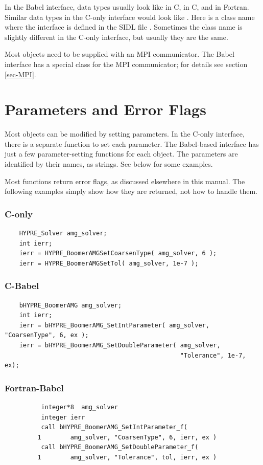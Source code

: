 In the Babel interface, data types usually look like  in
C,  in C, and  in Fortran.  Similar
data types in the C-only interface would look like
.  Here  is a class name where the
interface is defined in the SIDL file .
Sometimes the class name is slightly different in the C-only
interface, but usually they are the same.

Most \hypre{} objects need to be supplied with an MPI communicator.
The Babel interface has a special class for the MPI communicator; for
details see section \ref{sec-MPI}.

\section{Parameters and Error Flags}
\label{sec-Parameters-ErrorFlags}

Most \hypre{} objects can be modified by setting parameters.  In the
C-only interface, there is a separate function to set each parameter.
The Babel-based interface has just a few parameter-setting functions
for each object.  The parameters are identified by their names, as
strings.  See below for some examples.

Most \hypre{} functions return error flags, as discussed elsewhere in
this manual. The following examples simply show how they are returned,
not how to handle them.

\subsubsection{C-only}
\begin{verbatim}
    HYPRE_Solver amg_solver;
    int ierr;
    ierr = HYPRE_BoomerAMGSetCoarsenType( amg_solver, 6 );
    ierr = HYPRE_BoomerAMGSetTol( amg_solver, 1e-7 );
\end{verbatim}

\subsubsection{C-Babel}
\begin{verbatim}
    bHYPRE_BoomerAMG amg_solver;
    int ierr;
    ierr = bHYPRE_BoomerAMG_SetIntParameter( amg_solver, "CoarsenType", 6, ex );
    ierr = bHYPRE_BoomerAMG_SetDoubleParameter( amg_solver,
                                                "Tolerance", 1e-7, ex);
\end{verbatim}

\subsubsection{Fortran-Babel}
\begin{verbatim}
          integer*8  amg_solver
          integer ierr
          call bHYPRE_BoomerAMG_SetIntParameter_f(
         1        amg_solver, "CoarsenType", 6, ierr, ex )
          call bHYPRE_BoomerAMG_SetDoubleParameter_f(
         1        amg_solver, "Tolerance", tol, ierr, ex )
\end{verbatim}

